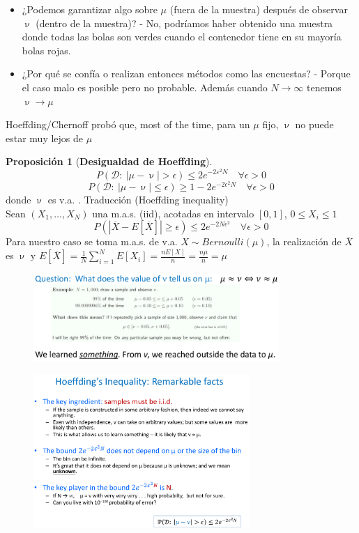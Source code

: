 \documentclass[11pt,a4paper]{article}
\theoremstyle{definition}
\newtheorem{proposition}{Proposición}[section]
\begin{document}
	\begin{itemize}
		\item ¿Podemos garantizar algo sobre $\mu$ (fuera de la muestra) después de observar $\upnu$ (dentro de la muestra)? - No, podríamos haber obtenido una muestra donde todas las bolas son verdes cuando el contenedor tiene en su mayoría bolas rojas.
		\item ¿Por qué se confía o realizan entonces métodos como las encuestas? - Porque el caso malo es posible pero no probable. Además cuando $N\to \infty$ tenemos $\upnu \to \mu$
	\end{itemize}
	
	Hoeffding/Chernoff probó que, most of the time, para un $\mu$ fijo, $\upnu$ no puede estar muy lejos de $\mu$
	\begin{proposition}[\bf Desigualdad de Hoeffding]
	$$P(\mathcal{D}:\ |\mu - \upnu| >\epsilon) \leq 2 e^{-2\varepsilon ^2 N} \quad \forall \epsilon >0$$
	$$P(\mathcal{D}:\ |\mu - \upnu| \leq \epsilon) \geq 1 - 2e^{-2\epsilon^2 N} \quad \forall \epsilon > 0$$
	donde $\upnu$ es v.a. . Traducción (Hoeffding inequality)\\
	Sean $(X_1, \ldots,  X_N)$ una m.a.s. (iid), acotadas en intervalo $[0,1]$, $0\leq X_i\leq 1$
	$$P(|\overline{X} - E[\overline{X}]| \geq \epsilon) \leq 2e^{-2N\epsilon^2} \quad \forall \epsilon >0$$
	Para nuestro caso se toma m.a.s. de v.a. $X\sim Bernoulli(\mu)$, la realización de $\overline{X}$ es $\upnu$ y $E[\overline{X}]=\frac{1}{N} \sum_{i=1}^N E[X_i]=\frac{nE[X]}{n}=\frac{n\mu}{n}=\mu$
	
	\end{proposition}
	
	\begin{figure}[H]
		\centering
		\includegraphics[width=0.83\textwidth]{images/hoeffding_learned_something}
	\end{figure}
	
	\begin{figure}[H]
		\centering
		\includegraphics[width=0.73\textwidth]{images/hoeffding_remarkable}
	\end{figure}
	
\end{document}
